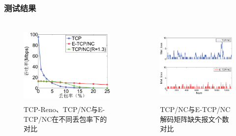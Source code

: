 \begin{frame}[allowframebreaks]
	\frametitle{测试结果}
	\begin{columns}
		\begin{column}{0.5\textwidth}
			\begin{figure}
			\includegraphics[height=4cm]{../figures/adaptive_redundancy.eps}
			\caption{TCP-Reno、TCP/NC与E-TCP/NC在不同丢包率下的对比}
			\label{fig:adap_redun}
		\end{figure}
		\end{column}
		\begin{column}{0.5\textwidth}
			\begin{figure}
				
			
			\includegraphics[height=4cm]{../figures/buchang.eps}
			\caption{TCP/NC与E-TCP/NC解码矩阵缺失报文个数对比}
			\label{fig:queshigeshu}
		\end{figure}
		\end{column}
	\end{columns}
	\newpage
\end{frame}

